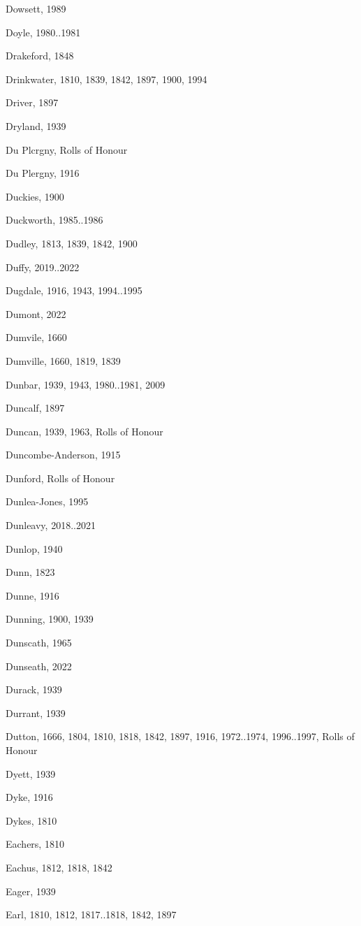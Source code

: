 \begin{theindex}
\item Dowsett, 1989
\item Doyle, 1980..1981
\item Drakeford, 1848
\item Drinkwater, 1810, 1839, 1842, 1897, 1900, 1994
\item Driver, 1897
\item Dryland, 1939
\item Du Plcrgny, Rolls of Honour
\item Du Plergny, 1916
\item Duckies, 1900
\item Duckworth, 1985..1986
\item Dudley, 1813, 1839, 1842, 1900
\item Duffy, 2019..2022
\item Dugdale, 1916, 1943, 1994..1995
\item Dumont, 2022
\item Dumvile, 1660
\item Dumville, 1660, 1819, 1839
\item Dunbar, 1939, 1943, 1980..1981, 2009
\item Duncalf, 1897
\item Duncan, 1939, 1963, Rolls of Honour
\item Duncombe-Anderson, 1915
\item Dunford, Rolls of Honour
\item Dunlea-Jones, 1995
\item Dunleavy, 2018..2021
\item Dunlop, 1940
\item Dunn, 1823
\item Dunne, 1916
\item Dunning, 1900, 1939
\item Dunscath, 1965
\item Dunseath, 2022
\item Durack, 1939
\item Durrant, 1939
\item Dutton, 1666, 1804, 1810, 1818, 1842, 1897, 1916, 1972..1974, 1996..1997, Rolls of Honour
\item Dyett, 1939
\item Dyke, 1916
\item Dykes, 1810
\item Eachers, 1810
\item Eachus, 1812, 1818, 1842
\item Eager, 1939
\item Earl, 1810, 1812, 1817..1818, 1842, 1897

\end{theindex}
